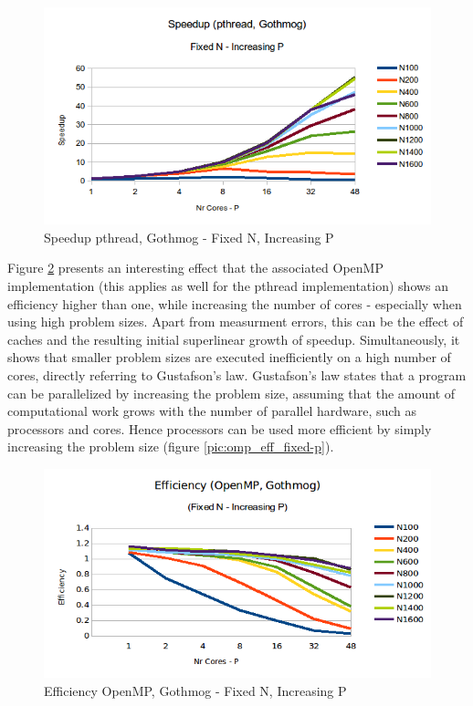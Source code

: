 \documentclass[conference]{IEEEtran}
\begin{document}
\begin{figure}[h]
  \centering
  \includegraphics[scale=0.55]{pic/pthread_gothmog_speedup-fixed-n.png} 
  \caption{Speedup pthread, Gothmog - Fixed N, Increasing P}
  \label{pic:pthread_speedup_fixed-n}
\end{figure}

Figure \ref{pic:omp_efficiency_fixed-n} presents an interesting effect that the associated OpenMP implementation (this applies as well for the pthread implementation) shows an efficiency higher than one, while increasing the number of cores - especially when using high problem sizes. Apart from measurment errors, this can be the effect of caches and the resulting initial superlinear growth of speedup. Simultaneously, it shows that smaller problem sizes are executed inefficiently on a high number of cores, directly referring to Gustafson's law. Gustafson's law states that a program can be parallelized by increasing the problem size, assuming that the amount of computational work grows with the number of parallel hardware, such as processors and cores. Hence processors can be used more efficient by simply increasing the problem size (figure \ref{pic:omp_eff_fixed-p}). 

\begin{figure}[h]
  \centering
  \includegraphics[scale=0.42]{pic/omp_gothmog_efficiency-fixed-n.png} 
  \caption{Efficiency OpenMP, Gothmog - Fixed N, Increasing P}
  \label{pic:omp_efficiency_fixed-n}
\end{figure}
\end{document}
